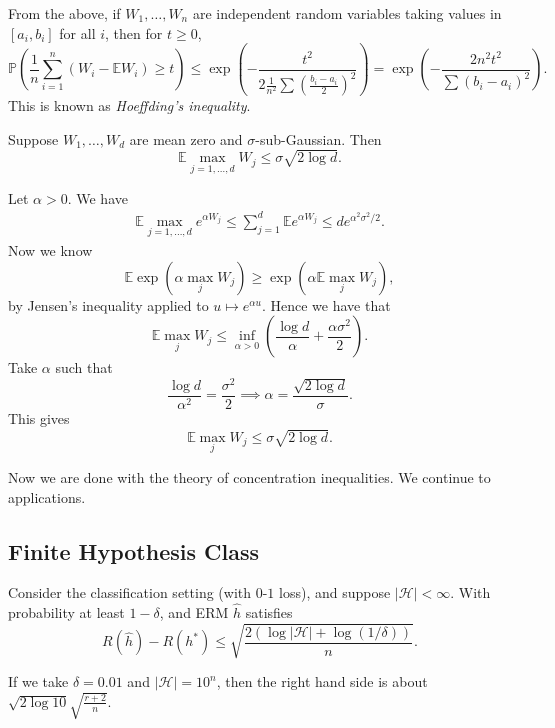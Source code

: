 \documentclass[12pt]{article}
\begin{document}
From the above, if $W_1, \ldots, W_n$ are independent random variables taking values in $[a_i, b_i]$ for all $i$, then for $t \geq 0$,
\[
\mathbb{P} \left( \frac{1}{n} \sum_{i = 1}^n (W_i-  \mathbb{E} W_i ) \geq t \right) \leq \exp \left( - \frac{t^2}{2 \frac{1}{n^2} \sum (\frac{b_i - a_i}{2})^2} \right) = \exp \left(- \frac{2n^2t^2}{\sum (b_i - a_i)^2} \right).
\]
This is known as \emph{Hoeffding's inequality}.

\begin{proposition}
	Suppose $W_1, \ldots, W_d$ are mean zero and $\sigma$-sub-Gaussian. Then
	\[
		\mathbb{E} \max_{j = 1, \ldots, d} W_j \leq \sigma \sqrt{2 \log d}.
	\]
\end{proposition}

\begin{proofbox}
	Let $\alpha > 0$. We have
	\begin{align*}
		\mathbb{E} \max_{j = 1, \ldots, d} e^{\alpha W_j} \leq \sum_{j = 1}^d \mathbb{E} e^{\alpha W_j} \leq d e^{\alpha^2 \sigma^2/2}.
	\end{align*}
	Now we know
	\[
	\mathbb{E} \exp(\alpha \max_j W_j) \geq \exp(\alpha \mathbb{E} \max_j W_j),
	\]
	by Jensen's inequality applied to $u \mapsto e^{\alpha u}$. Hence we have that
	\[
	\mathbb{E} \max_j W_j \leq \inf_{\alpha > 0} \left( \frac{\log d}{\alpha} + \frac{\alpha \sigma^2}{2} \right).
	\]
	Take $\alpha$ such that
	\[
		\frac{\log d}{\alpha^2} = \frac{\sigma^2}{2} \implies \alpha = \frac{\sqrt{2 \log d}}{\sigma}.
	\]
	This gives
	\[
		\mathbb{E} \max_j W_j \leq \sigma \sqrt{2 \log d}.
	\]
\end{proofbox}

Now we are done with the theory of concentration inequalities. We continue to applications.

\subsection{Finite Hypothesis Class}
\label{sub:fin_hyp}

\begin{theorem}
	Consider the classification setting (with $0$-$1$ loss), and suppose $|\mathcal{H}| < \infty$. With probability at least $1 - \delta$, and ERM $\hat h$ satisfies
	\[
		R(\hat h) - R(h^\ast) \leq \sqrt{\frac{2( \log |\mathcal{H}| + \log(1/\delta))}{n}}.
	\]
\end{theorem}

If we take $\delta = 0.01$ and $|\mathcal{H}| = 10^n$, then the right hand side is about $\sqrt{2 \log 10}\sqrt{\frac{r+2}{n}}$.
\end{document}
